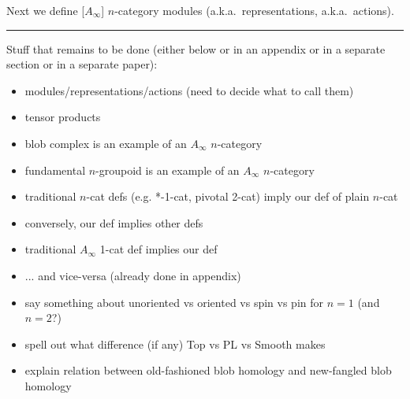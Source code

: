 \medskip

Next we define [$A_\infty$] $n$-category modules (a.k.a.\ representations,
a.k.a.\ actions).

\medskip
\hrule
\medskip

\medskip


Stuff that remains to be done (either below or in an appendix or in a separate section or in
a separate paper):
\begin{itemize}
\item modules/representations/actions (need to decide what to call them)
\item tensor products
\item blob complex is an example of an $A_\infty$ $n$-category
\item fundamental $n$-groupoid is an example of an $A_\infty$ $n$-category
\item traditional $n$-cat defs (e.g. *-1-cat, pivotal 2-cat) imply our def of plain $n$-cat
\item conversely, our def implies other defs
\item traditional $A_\infty$ 1-cat def implies our def
\item ... and vice-versa (already done in appendix)
\item say something about unoriented vs oriented vs spin vs pin for $n=1$ (and $n=2$?)
\item spell out what difference (if any) Top vs PL vs Smooth makes
\item explain relation between old-fashioned blob homology and new-fangled blob homology
\end{itemize}


